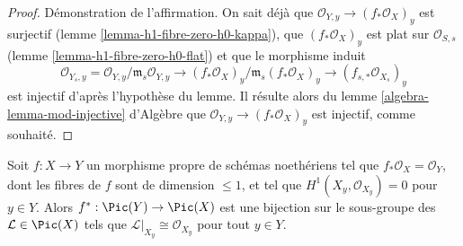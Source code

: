 \begin{proof}
\medskip\noindent
Démonstration de l'affirmation. On sait déjà que
$\mathcal{O}_{Y, y} \longrightarrow (f_*\mathcal{O}_X)_y$
est surjectif (lemme \ref{lemma-h1-fibre-zero-h0-kappa}),
que $(f_*\mathcal{O}_X)_y$ est
plat sur $\mathcal{O}_{S, s}$ (lemme \ref{lemma-h1-fibre-zero-h0-flat})
et que le morphisme induit
$$
\mathcal{O}_{Y_s, y} =  \mathcal{O}_{Y, y}/\mathfrak m_s\mathcal{O}_{Y, y}
\longrightarrow
(f_*\mathcal{O}_X)_y/\mathfrak m_s (f_*\mathcal{O}_X)_y
\to
(f_{s, *}\mathcal{O}_{X_s})_y
$$
est injectif d'après l'hypothèse du lemme. Il résulte alors du
lemme \ref{algebra-lemma-mod-injective} d'Algèbre
que $\mathcal{O}_{Y, y} \longrightarrow (f_*\mathcal{O}_X)_y$
est injectif, comme souhaité.
\end{proof}

\begin{lemma}
\label{lemma-bijection-on-Pic}
Soit $f : X \to Y$ un morphisme propre de schémas noethériens
tel que $f_*\mathcal{O}_X = \mathcal{O}_Y$, dont
les fibres de $f$ sont de dimension $\leq 1$, et tel que
$H^1(X_y, \mathcal{O}_{X_y}) = 0$ pour $y \in Y$.
Alors $f^* : \Pic(Y) \to \Pic(X)$ est une bijection sur
le sous-groupe des $\mathcal{L} \in \Pic(X)$ tels que
$\mathcal{L}|_{X_y} \cong \mathcal{O}_{X_y}$
pour tout $y \in Y$.
\end{lemma}

